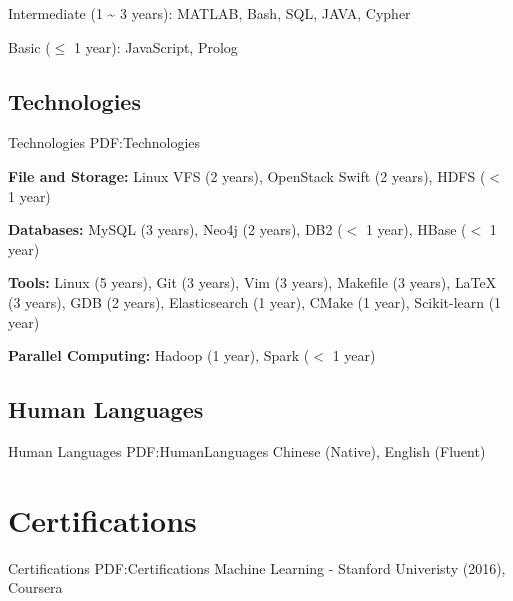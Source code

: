 \documentclass[letterpaper,10pt,oneside]{article}
\begin{document}
\begin{body}
\GapNoBreak
\BulletItem
Intermediate (1 {\textasciitilde} 3 years): MATLAB, Bash, SQL, JAVA, Cypher

\GapNoBreak
\BulletItem
Basic ($\leq$ 1 year): JavaScript, Prolog
\BigGap
\GapNoBreak
\subsection
{Technologies}
{Technologies}
{PDF:Technologies}

\GapNoBreak
\BulletItem
\textbf{File and Storage:} Linux VFS (2 years), OpenStack Swift (2 years), HDFS ($<$ 1 year)

\GapNoBreak
\BulletItem
\textbf{Databases:} MySQL (3 years), Neo4j (2 years), DB2 ($<$ 1 year), HBase ($<$ 1 year)


\GapNoBreak
\BulletItem
\textbf{Tools:} Linux (5 years), Git (3 years), Vim (3 years), Makefile (3 years), {\LaTeX} (3 years), GDB (2 years), Elasticsearch (1 year), CMake (1 year), Scikit-learn (1 year)

\GapNoBreak
\BulletItem
\textbf{Parallel Computing:} Hadoop (1 year), Spark ($<$ 1 year)

\BigGap
\subsection
{Human Languages}
{Human Languages}
{PDF:HumanLanguages}
\GapNoBreak
\BulletItem
Chinese (Native), English (Fluent)


\section
{Certifications}
{Certifications}
{PDF:Certifications}
Machine Learning - Stanford Univeristy (2016), Coursera
\GapNoBreak






\end{body}
\end{document}
